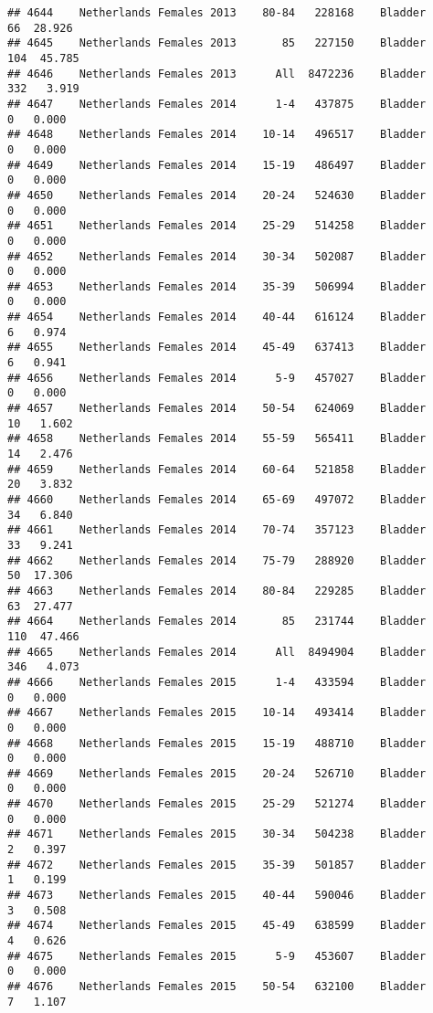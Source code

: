 \documentclass[
]{article}
\begin{document}
\begin{verbatim}
## 4644    Netherlands Females 2013    80-84   228168    Bladder     66  28.926
## 4645    Netherlands Females 2013       85   227150    Bladder    104  45.785
## 4646    Netherlands Females 2013      All  8472236    Bladder    332   3.919
## 4647    Netherlands Females 2014      1-4   437875    Bladder      0   0.000
## 4648    Netherlands Females 2014    10-14   496517    Bladder      0   0.000
## 4649    Netherlands Females 2014    15-19   486497    Bladder      0   0.000
## 4650    Netherlands Females 2014    20-24   524630    Bladder      0   0.000
## 4651    Netherlands Females 2014    25-29   514258    Bladder      0   0.000
## 4652    Netherlands Females 2014    30-34   502087    Bladder      0   0.000
## 4653    Netherlands Females 2014    35-39   506994    Bladder      0   0.000
## 4654    Netherlands Females 2014    40-44   616124    Bladder      6   0.974
## 4655    Netherlands Females 2014    45-49   637413    Bladder      6   0.941
## 4656    Netherlands Females 2014      5-9   457027    Bladder      0   0.000
## 4657    Netherlands Females 2014    50-54   624069    Bladder     10   1.602
## 4658    Netherlands Females 2014    55-59   565411    Bladder     14   2.476
## 4659    Netherlands Females 2014    60-64   521858    Bladder     20   3.832
## 4660    Netherlands Females 2014    65-69   497072    Bladder     34   6.840
## 4661    Netherlands Females 2014    70-74   357123    Bladder     33   9.241
## 4662    Netherlands Females 2014    75-79   288920    Bladder     50  17.306
## 4663    Netherlands Females 2014    80-84   229285    Bladder     63  27.477
## 4664    Netherlands Females 2014       85   231744    Bladder    110  47.466
## 4665    Netherlands Females 2014      All  8494904    Bladder    346   4.073
## 4666    Netherlands Females 2015      1-4   433594    Bladder      0   0.000
## 4667    Netherlands Females 2015    10-14   493414    Bladder      0   0.000
## 4668    Netherlands Females 2015    15-19   488710    Bladder      0   0.000
## 4669    Netherlands Females 2015    20-24   526710    Bladder      0   0.000
## 4670    Netherlands Females 2015    25-29   521274    Bladder      0   0.000
## 4671    Netherlands Females 2015    30-34   504238    Bladder      2   0.397
## 4672    Netherlands Females 2015    35-39   501857    Bladder      1   0.199
## 4673    Netherlands Females 2015    40-44   590046    Bladder      3   0.508
## 4674    Netherlands Females 2015    45-49   638599    Bladder      4   0.626
## 4675    Netherlands Females 2015      5-9   453607    Bladder      0   0.000
## 4676    Netherlands Females 2015    50-54   632100    Bladder      7   1.107

\end{verbatim}
\end{document}
